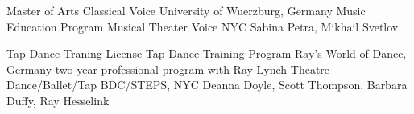 \begin{cventries}
  \cventrytab
    {Master of Arts}
    {Classical Voice}
    {University of Wuerzburg, Germany}
    {Music Education Program}
 \cventrytab
    {}
    {Musical Theater Voice}
    {NYC}
    {Sabina Petra, Mikhail Svetlov}
\end{cventries}
\begin{cventries}
    \cventrytab
      {Tap Dance Traning License}
      {Tap Dance Training Program}
      {Ray's World of Dance, Germany}
      {two-year professional program with Ray Lynch}
    \cventrytab
      {}
      {Theatre Dance/Ballet/Tap}
      {BDC/STEPS, NYC}
      {Deanna Doyle, Scott Thompson, Barbara Duffy, Ray Hesselink}
\end{cventries}
